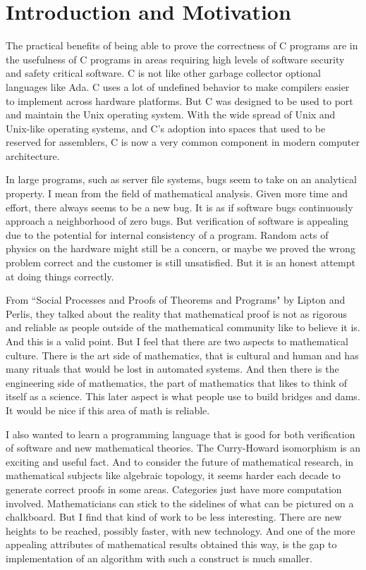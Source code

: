 \section{Introduction and Motivation}
\label{sec:introduction}


The practical benefits of being able to prove the correctness of C programs are in the usefulness of C programs in areas requiring high levels of software security and safety critical software. C is not like other garbage collector optional languages like Ada. C uses a lot of undefined behavior to make compilers easier to implement across hardware platforms. But C was designed to be used to port and maintain the Unix operating system. With the wide spread of Unix and Unix-like operating systems, and C's adoption into spaces that used to be reserved for assemblers, C is now a very common component in modern computer architecture.


In large programs, such as server file systems, bugs seem to take on an analytical property. I mean from the field of mathematical analysis. Given more time and effort, there always seems to be a new bug. It is as if software bugs continuously approach a neighborhood of zero bugs. But verification of software is appealing due to the potential for internal consistency of a program. Random acts of physics on the hardware might still be a concern, or maybe we proved the wrong problem correct and the customer is still unsatisfied. But it is an honest attempt at doing things correctly.

From “Social Processes and Proofs of Theorems and Programs" by Lipton and Perlis, they talked about the reality that mathematical proof is not as rigorous and reliable as people outside of the mathematical community like to believe it is. \cite{lipton_social_1979} And this is a valid point. But I feel that there are two aspects to mathematical culture. There is the art side of mathematics, that is cultural and human and has many rituals that would be lost in automated systems. And then there is the engineering side of mathematics, the part of mathematics that likes to think of itself as a science. This later aspect is what people use to build bridges and dams. It would be nice if this area of math is reliable.

I also wanted to learn a programming language that is good for both verification of software and new mathematical theories. The Curry-Howard isomorphism is an exciting and useful fact. And to consider the future of mathematical research, in mathematical subjects like algebraic topology, it seems harder each decade to generate correct proofs in some areas. Categories just have more computation involved. Mathematicians can stick to the sidelines of what can be pictured on a chalkboard. But I find that kind of work to be less interesting. There are new heights to be reached, possibly faster, with new technology. And one of the more appealing attributes of mathematical results obtained this way, is the gap to implementation of an algorithm with such a construct is much smaller.

